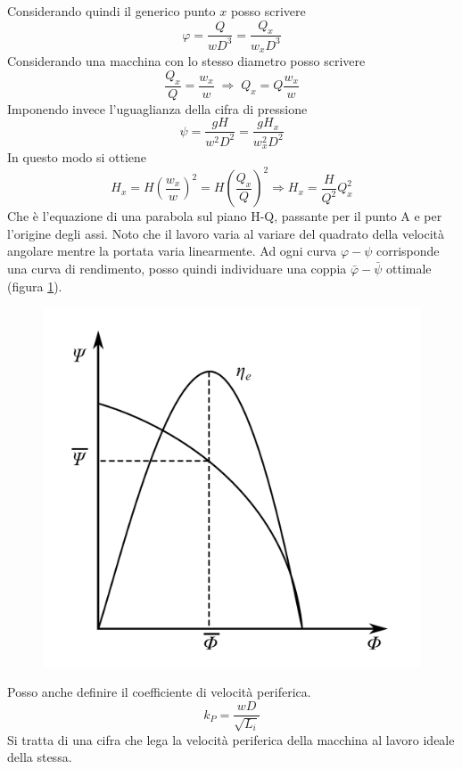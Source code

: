 Considerando quindi il generico punto $x$ posso scrivere
\begin{equation}
\varphi = \frac{Q}{w D^3}= \frac{Q_x}{w_x D^3}
\end{equation}
Considerando una macchina con lo stesso diametro posso scrivere
\begin{equation}
\frac{Q_x}{Q}=\frac{w_x}{w} \; \Rightarrow \; Q_x = Q \frac{w_x}{w}
\end{equation}
Imponendo invece l'uguaglianza della cifra di pressione
\begin{equation}
\psi = \frac{gH}{w^2 D^2}= \frac{gH_x}{w_x^2 D^2}
\end{equation}
In questo modo si ottiene
\begin{equation}
H_x = H(\frac{w_x}{w})^2 = H(\frac{Q_x}{Q})^2 \Rightarrow H_x = \frac{H}{Q^2}Q_x^2
\end{equation}
Che è l'equazione di una parabola sul piano H-Q, passante per il punto A e per l'origine degli assi. 
Noto che il lavoro varia al variare del quadrato della velocità angolare mentre la portata varia linearmente. 
Ad ogni curva $\varphi - \psi$ corrisponde una curva di rendimento, posso quindi individuare una coppia $\bar{\varphi} - \bar{\psi}$ ottimale (figura \ref{fig:adim}).
\begin{figure}[h!]
\centering
  \includegraphics[width=.3\textwidth]{fig/adim.pdf}
\caption{}
\label{fig:adim}
\end{figure}
Posso anche definire il coefficiente di velocità periferica.
\begin{equation}
k_P = \frac{w D}{\sqrt{L_i}}
\end{equation}
Si tratta di una cifra che lega la velocità periferica della macchina al lavoro ideale della stessa.

